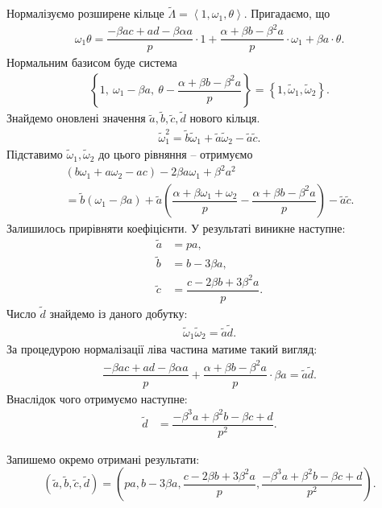 \documentclass{thesis}
\begin{document}
Нормалізуємо розширене кільце $\tilde{\Lambda} = \left<1, \omega_1, \theta\right>$. Пригадаємо, що
\begin{align*}
\omega_1 \theta = \dfrac{-\beta a c + ad - \beta \alpha a}{p} \cdot 1 + \dfrac{\alpha + \beta b - \beta^2 a}{p} \cdot \omega_1 + \beta a \cdot \theta.
\end{align*}
Нормальним базисом буде система
\begin{align*}
\left\{ 1,\ \omega_1-\beta a,\ \theta - \dfrac{\alpha+\beta b - \beta^2 a}{p} \right\} = \left\{1,\tilde{\omega}_1,\tilde{\omega}_2\right\}.
\end{align*}
Знайдемо оновлені значення  $\tilde{a},\tilde{b},\tilde{c},\tilde{d}$ нового кільця.
\begin{align*}
\tilde{\omega}_1^2 = \tilde{b} \tilde{\omega}_1 + \tilde{a} \tilde{\omega}_2 - \tilde{a} \tilde{c}.
\end{align*}
Підставимо $\tilde{\omega}_1,\tilde{\omega}_2$ до цього рівняння -- отримуємо
\begin{align*}
(b \omega_1 + a \omega_2 - ac) - 2 \beta a \omega_1 + \beta^2 a^2 \\ = \tilde{b} (\omega_1 - \beta a) + \tilde{a} \left( \dfrac{\alpha + \beta \omega_1 + \omega_2}{p} - \dfrac{\alpha + \beta b - \beta^2 a}{p}\right) - \tilde{a} \tilde{c}.
\end{align*}
Залишилось прирівняти коефіцієнти. У результаті виникне наступне:
\begin{align*}
\tilde{a} & = p a, \\
\tilde{b} & = b - 3 \beta a, \\
\tilde{c} & = \dfrac{c - 2 \beta b + 3 \beta^2 a}{p}.
\end{align*}
Число $\tilde{d}$ знайдемо із даного добутку:
\begin{align*}
\tilde{\omega}_1 \tilde{\omega}_2 = \tilde{a} \tilde{d}.
\end{align*}
За процедурою нормалізації ліва частина матиме такий вигляд:
\begin{align*}
\dfrac{-\beta a c + ad - \beta \alpha a}{p}+ \dfrac{\alpha + \beta b - \beta^2 a}{p} \cdot \beta a = \tilde{a} \tilde{d}.
\end{align*}
Внаслідок чого отримуємо наступне:
\begin{align*}
\tilde{d} & = \dfrac{-\beta^3 a + \beta^2 b - \beta c + d}{p^2}.
\end{align*}

Запишемо окремо отримані результати:
\begin{equation}
\label{a_b_c_d_for_extended_ring_where_theta_cubed_not_in_tilde_lambda}
\left( \tilde{a},\tilde{b},\tilde{c},\tilde{d} \right) = \left( pa, b - 3 \beta a, \dfrac{c \!- 2 \beta b \! + 3 \beta^2 a}{p}, \dfrac{-\beta^3 a \! + \beta^2 b \! - \beta c \! + d}{p^2} \right).
\end{equation}
\end{document}
